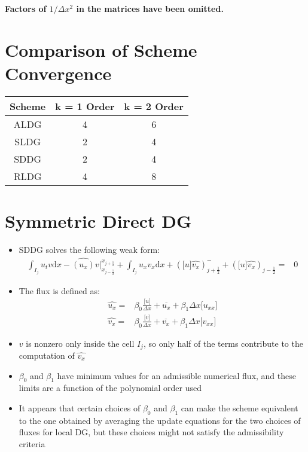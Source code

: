 \documentclass[10pt,letterpaper]{article}
\begin{document}
\textbf{Factors of $1/\Delta x^2$ in the matrices have been omitted.}

\section{Comparison of Scheme Convergence}
\begin{tabular}{c|c|c}
Scheme & k = 1 Order & k = 2 Order\\
\hline
ALDG & 4 & 6\\
SLDG & 2 & 4\\
SDDG & 2 & 4\\
RLDG & 4 & 8
\end{tabular}

\section{Symmetric Direct DG}
\begin{itemize}
  \item SDDG solves the following weak form:
    \begin{align*}
      \int_{I_j} u_t v \mathrm{d}x -\widehat{(u_x)}v\bigr|_{x_{j-\frac{1}{2}}}^{x_{j+\frac{1}{2}}}+\int_{I_j} u_x v_x \mathrm{d}x+ (\lbrack u\rbrack\widehat{v_x})_{j+\frac{1}{2}}^- + (\lbrack u\rbrack \widehat{v_x} )_{j-\frac{1}{2}} = & 0
    \end{align*}
	\item The flux is defined as:
    \begin{align*}
      \widehat{u_x} = & \beta_0 \frac{\lbrack u \rbrack}{\Delta x} + \overline{u_x} + \beta_1 \Delta x \lbrack u_{xx} \rbrack\\
      \widehat{v_x} = & \beta_0 \frac{\lbrack v \rbrack}{\Delta x} + \overline{v_x} + \beta_1 \Delta x \lbrack v_{xx} \rbrack
    \end{align*}
  \item $v$ is nonzero only inside the cell $I_j$, so only half of the terms contribute to the computation of $\widehat{v_x}$
  \item $\beta_0$ and $\beta_1$ have minimum values for an admissible numerical flux, and these limits are a function of the polynomial order used
  \item It appears that certain choices of $\beta_0$ and $\beta_1$ can make the scheme equivalent to the one obtained by averaging the update equations for the two choices of fluxes for local DG, but these choices might not satisfy the admissibility criteria
\end{itemize}
  
\end{document}

